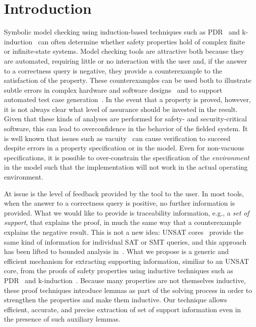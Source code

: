 \section{Introduction}
\label{sec:intro}


Symbolic model checking using induction-based techniques such as PDR~\cite{Een} and k-induction~\cite{Sheeran} can often determine whether safety properties hold of complex finite or infinite-state systems.  Model checking tools are attractive both because they are automated, requiring little or no interaction with the user and, if the answer to a correctness query is negative, they provide a counterexample to the satisfaction of the property.  These counterexamples can be used both to illustrate subtle errors in complex hardware and software designs~\cite{SoftwareModelCheckingTakesOff, more} and to support automated test case generation~\cite{Heimdahl, Gargantini}.
In the event that a property is proved, however, it is not always clear what level of assurance should be invested in the result.  Given that these kinds of analyses are performed for safety- and security-critical software, this can lead to overconfidence in the behavior of the fielded system.  It is well known that issues such as vacuity~\cite{Kupferman} can cause verification to succeed despite errors in a property specification or in the model. Even for non-vacuous specifications, it is possible to over-constrain the specification of the {\em environment} in the model such that the implementation will not work in the actual operating environment.

At issue is the level of feedback provided by the tool to the user. In
most tools, when the answer to a correctness query is positive, no
further information is provided. What we would like to provide is
traceability information, e.g., a {\em set of support}, that explains
the proof, in much the same way that a counterexample explains the
negative result. This is not a new idea: UNSAT cores~\cite{zhang2003extracting}
provide the same kind of information for individual SAT or
SMT queries, and this approach has been lifted to bounded analysis
in~\cite{Kodkodpaper}. What we propose is a generic and efficient
mechanism for extracting supporting information, similiar to an UNSAT
core, from the proofs of safety properties using inductive techniques
such as PDR~\cite{Een} and k-induction~\cite{Sheeran}. Because many
properties are not themselves inductive, these proof techniques
introduce lemmas as part of the solving process in order to strengthen
the properties and make them inductive. Our technique allows
efficient, accurate, and precise extraction of set of support
information even in the presence of such auxiliary lemmas.

